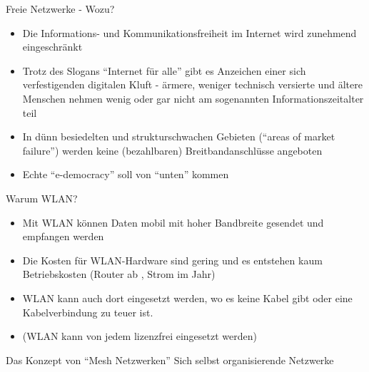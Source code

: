 \documentclass[aspectratio=43]{beamer}
\begin{document}
\begin{frame}{Freie Netzwerke - Wozu?} %
	\begin{itemize}
		\item Die Informations- und Kommunikationsfreiheit im Internet wird zunehmend eingeschränkt
		\item Trotz des Slogans ``Internet für alle'' gibt es Anzeichen einer sich verfestigenden digitalen Kluft - ärmere, weniger technisch versierte und ältere Menschen nehmen wenig oder gar nicht am sogenannten Informationszeitalter teil
		\item In dünn besiedelten und strukturschwachen Gebieten (``areas of market failure'') werden keine (bezahlbaren) Breitbandanschlüsse angeboten
		\item Echte ``e-democracy'' soll von ``unten'' kommen
	\end{itemize}
\end{frame}

\begin{frame}{Warum WLAN?}
	\begin{itemize}
		\item Mit WLAN können Daten mobil mit hoher Bandbreite gesendet und empfangen werden
		\item Die Kosten für WLAN-Hardware sind gering und es entstehen kaum Betriebskosten (Router ab , Strom  im Jahr)
		\item WLAN kann auch dort eingesetzt werden, wo es keine Kabel gibt oder eine Kabelverbindung zu teuer ist. %
		\item (WLAN kann von jedem lizenzfrei eingesetzt werden) %
	\end{itemize}
\end{frame}

\begin{frame}{Das Konzept von ``Mesh Netzwerken''} %
	Sich selbst organisierende Netzwerke
\end{frame}
\end{document}
